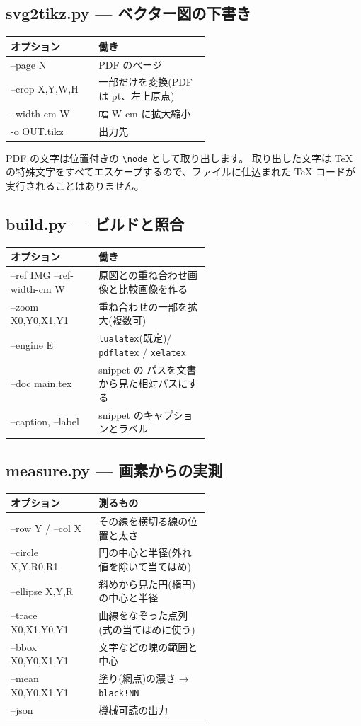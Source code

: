 \documentclass[a4paper,11pt]{ltjsarticle}
\begin{document}
\subsection{svg2tikz.py --- ベクター図の下書き}
\begin{tabular}{>{\ttfamily}l p{0.56\linewidth}}
\toprule
\normalfont オプション & 働き \\ \midrule
--page N & PDF のページ \\
--crop X,Y,W,H & 一部だけを変換(PDF は pt、左上原点) \\
--width-cm W & 幅 W cm に拡大縮小 \\
-o OUT.tikz & 出力先 \\
\bottomrule
\end{tabular}

\noindent PDF の文字は位置付きの \verb|\node| として取り出します。
取り出した文字は TeX の特殊文字をすべてエスケープするので、ファイルに仕込まれた
TeX コードが実行されることはありません。

\subsection{build.py --- ビルドと照合}
\begin{tabular}{>{\ttfamily}l p{0.56\linewidth}}
\toprule
\normalfont オプション & 働き \\ \midrule
--ref IMG --ref-width-cm W & 原図との重ね合わせ画像と比較画像を作る \\
--zoom X0,Y0,X1,Y1 & 重ね合わせの一部を拡大(複数可) \\
--engine E & \texttt{lualatex}(既定)/ \texttt{pdflatex} / \texttt{xelatex} \\
--doc main.tex & snippet の \verb|| パスを文書から見た相対パスにする \\
--caption, --label & snippet のキャプションとラベル \\
\bottomrule
\end{tabular}

\subsection{measure.py --- 画素からの実測}
\begin{tabular}{>{\ttfamily}l p{0.56\linewidth}}
\toprule
\normalfont オプション & 測るもの \\ \midrule
--row Y / --col X & その線を横切る線の位置と太さ \\
--circle X,Y,R0,R1 & 円の中心と半径(外れ値を除いて当てはめ) \\
--ellipse X,Y,R & 斜めから見た円(楕円)の中心と半径 \\
--trace X0,X1,Y0,Y1 & 曲線をなぞった点列(式の当てはめに使う) \\
--bbox X0,Y0,X1,Y1 & 文字などの塊の範囲と中心 \\
--mean X0,Y0,X1,Y1 & 塗り(網点)の濃さ → \verb|black!NN| \\
--json & 機械可読の出力 \\
\bottomrule
\end{tabular}
\end{document}
